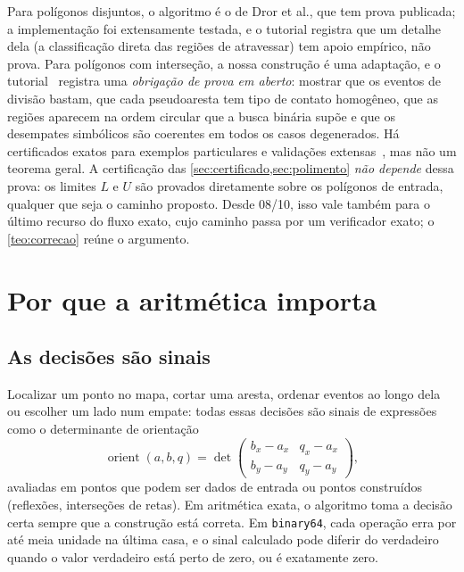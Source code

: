 \documentclass[11pt,a4paper]{article}
\theoremstyle{plain}\newtheorem{proposicao}{Proposição}
\theoremstyle{definition}\newtheorem{definicao}{Definição}
\theoremstyle{plain}\newtheorem{teorema}{Teorema}
\begin{document}
\begin{cuidado}
Para polígonos disjuntos, o algoritmo é o de Dror et al., que tem prova publicada; a implementação foi extensamente testada, e o tutorial registra que um detalhe dela (a classificação direta das regiões de atravessar) tem apoio empírico, não prova. Para polígonos com interseção, a nossa construção é uma adaptação, e o tutorial~\cite{tutorial} registra uma \emph{obrigação de prova em aberto}: mostrar que os eventos de divisão bastam, que cada pseudoaresta tem tipo de contato homogêneo, que as regiões aparecem na ordem circular que a busca binária supõe e que os desempates simbólicos são coerentes em todos os casos degenerados. Há certificados exatos para exemplos particulares e validações extensas~\cite{correcao}, mas não um teorema geral. A certificação das \cref{sec:certificado,sec:polimento} \emph{não depende} dessa prova: os limites \(L\) e \(U\) são provados diretamente sobre os polígonos de entrada, qualquer que seja o caminho proposto. Desde 08/10, isso vale também para o último recurso do fluxo exato, cujo caminho passa por um verificador exato; o \cref{teo:correcao} reúne o argumento.
\end{cuidado}

\section{Por que a aritmética importa}\label{sec:aritmetica}

\subsection{As decisões são sinais}
Localizar um ponto no mapa, cortar uma aresta, ordenar eventos ao longo dela ou escolher um lado num empate: todas essas decisões são sinais de expressões como o determinante de orientação
\begin{equation}\label{eq:orient}
\operatorname{orient}(a,b,q)=\det\begin{pmatrix}b_x-a_x & q_x-a_x\\ b_y-a_y & q_y-a_y\end{pmatrix},
\end{equation}
avaliadas em pontos que podem ser dados de entrada ou pontos construídos (reflexões, interseções de retas). Em aritmética exata, o algoritmo toma a decisão certa sempre que a construção está correta. Em \texttt{binary64}, cada operação erra por até meia unidade na última casa, e o sinal calculado pode diferir do verdadeiro quando o valor verdadeiro está perto de zero, ou é exatamente zero.
\end{document}

